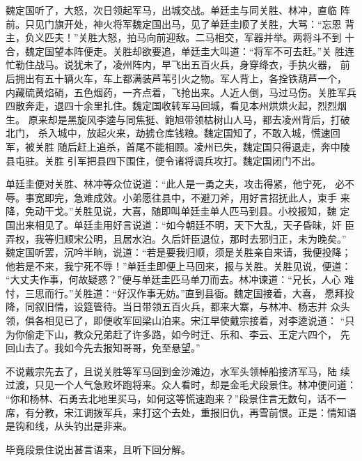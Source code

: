 魏定国听了，大怒，次日领起军马，出城交战。单廷圭与同关胜、林冲，直临
阵前。只见门旗开处，神火将军魏定国出马，见了单廷圭顺了关胜，大骂：“忘恩
背主，负义匹夫！”关胜大怒，拍马向前迎敌。二马相交，军器并举。两将斗不到
十合，魏定国望本阵便走。关胜却欲要追，单廷圭大叫道：“将军不可去赶。”关
胜连忙勒住战马。说犹未了，凌州阵内，早飞出五百火兵，身穿绛衣，手执火器，
前后拥出有五十辆火车，车上都满装芦苇引火之物。军人背上，各拴铁葫芦一个，
内藏硫黄焰硝，五色烟药，一齐点着，飞抢出来。人近人倒，马过马伤。关胜军兵
四散奔走，退四十余里扎住。魏定国收转军马回城，看见本州烘烘火起，烈烈烟生。
原来却是黑旋风李逵与同焦挺、鲍旭带领枯树山人马，都去凌州背后，打破北门，
杀入城中，放起火来，劫掳仓库钱粮。魏定国知了，不敢入城，慌速回军，被关胜
随后赶上追杀，首尾不能相顾。凌州已失，魏定国只得退走，奔中陵县屯驻。关胜
引军把县四下围住，便令诸将调兵攻打。魏定国闭门不出。

单廷圭便对关胜、林冲等众位说道：“此人是一勇之夫，攻击得紧，他宁死，
必不辱。事宽即完，急难成效。小弟愿往县中，不避刀斧，用好言招抚此人，束手
来降，免动干戈。”关胜见说，大喜，随即叫单廷圭单人匹马到县。小校报知，魏
定国出来相见了。单廷圭用好言说道：“如今朝廷不明，天下大乱，天子昏昧，奸
臣弄权，我等归顺宋公明，且居水泊。久后奸臣退位，那时去邪归正，未为晚矣。”
魏定国听罢，沉吟半晌，说道：“若是要我归顺，须是关胜亲自来请，我便投降；
他若是不来，我宁死不辱！”单廷圭即便上马回来，报与关胜。关胜见说，便道：
“大丈夫作事，何故疑惑？”便与单廷圭匹马单刀而去。林冲谏道：“兄长，人心
难忖，三思而行。”关胜道：“好汉作事无妨。”直到县衙。魏定国接着，大喜，
愿拜投降，同叙旧情，设筵管待。当日带领五百火兵，都来大寨，与林冲、杨志并
众头领，俱各相见已了，即便收军回梁山泊来。宋江早使戴宗接着，对李逵说道：
“只为你偷走下山，教众兄弟赶了许多路，如今时迁、乐和、李云、王定六四个，
先回山去了。我如今先去报知哥哥，免至悬望。”

不说戴宗先去了，且说关胜等军马回到金沙滩边，水军头领棹船接济军马，陆
续过渡，只见一个人气急败坏跑将来。众人看时，却是金毛犬段景住。林冲便问道：
“你和杨林、石勇去北地里买马，如何这等慌速跑来？”段景住言无数句，话不一
席，有分教，宋江调拨军兵，来打这个去处，重报旧仇，再雪前恨。正是：情知语
是钩和线，从头钓出是非来。

毕竟段景住说出甚言语来，且听下回分解。